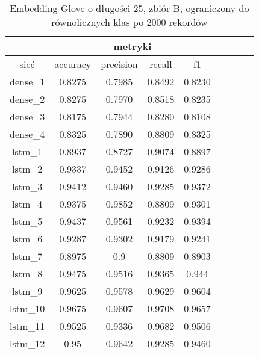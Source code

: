 \begin{table}[h] \label{tab:wyniki_glove_B_lim} \centering
    \caption{Embedding Glove o długości 25, zbiór B, ograniczony do równolicznych klas po 2000 rekordów}
    \begin{tabular} {|c|c|c|c|c|c|c|c|c| }    \hline
                 & \multicolumn{4}{c|}{metryki}                               \\ \hline
        sieć     & accuracy                     & precision & recall & f1     \\ \hline
        dense\_1 & 0.8275                       & 0.7985    & 0.8492 & 0.8230 \\ \hline
        dense\_2 & 0.8275                       & 0.7970    & 0.8518 & 0.8235 \\ \hline
        dense\_3 & 0.8175                       & 0.7944    & 0.8280 & 0.8108 \\ \hline
        dense\_4 & 0.8325                       & 0.7890    & 0.8809 & 0.8325 \\ \hline
        lstm\_1  & 0.8937                       & 0.8727    & 0.9074 & 0.8897 \\ \hline
        lstm\_2  & 0.9337                       & 0.9452    & 0.9126 & 0.9286 \\ \hline
        lstm\_3  & 0.9412                       & 0.9460    & 0.9285 & 0.9372 \\ \hline
        lstm\_4  & 0.9375                       & 0.9852    & 0.8809 & 0.9301 \\ \hline
        lstm\_5  & 0.9437                       & 0.9561    & 0.9232 & 0.9394 \\ \hline
        lstm\_6  & 0.9287                       & 0.9302    & 0.9179 & 0.9241 \\ \hline
        lstm\_7  & 0.8975                       & 0.9       & 0.8809 & 0.8903 \\ \hline
        lstm\_8  & 0.9475                       & 0.9516    & 0.9365 & 0.944  \\ \hline
        lstm\_9  & 0.9625                       & 0.9578    & 0.9629 & 0.9604 \\ \hline
        lstm\_10 & 0.9675                       & 0.9607    & 0.9708 & 0.9657 \\ \hline
        lstm\_11 & 0.9525                       & 0.9336    & 0.9682 & 0.9506 \\ \hline
        lstm\_12 & 0.95                         & 0.9642    & 0.9285 & 0.9460 \\ \hline

\end{tabular}
\end{table}
